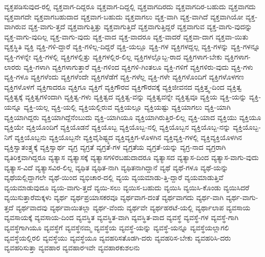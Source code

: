 {ವ್ಯಕ್ತಪಡಿಸುವುದ-ರಲ್ಲಿ
ವ್ಯಕ್ತವಾಗ-ದಿದ್ದರೂ
ವ್ಯಕ್ತವಾಗ-ದಿದ್ದಲ್ಲಿ
ವ್ಯಕ್ತವಾಗದಿರದು
ವ್ಯಕ್ತವಾಗದಿರ-ಬಹುದು
ವ್ಯಕ್ತವಾಗದು
ವ್ಯಕ್ತವಾಗದೇ
ವ್ಯಕ್ತವಾಗಬಹುದಾದ
ವ್ಯಕ್ತವಾಗ-ಬಹುದು
ವ್ಯಕ್ತವಾಗಲು
ವ್ಯಕ್ತ-ವಾಗಿ
ವ್ಯಕ್ತ-ವಾಗಿದೆ
ವ್ಯಕ್ತವಾಗಿಯೋ
ವ್ಯಕ್ತ-ವಾಗಿರುವ
ವ್ಯಕ್ತ-ವಾಗು-ತ್ತದೆ
ವ್ಯಕ್ತವಾಗುತ್ತಿತ್ತು
ವ್ಯಕ್ತವಾಗುತ್ತಿದೆ
ವ್ಯಕ್ತವಾಗುತ್ತಿದ್ದರೆ
ವ್ಯಕ್ತವಾಗುವ
ವ್ಯಕ್ತ-ವಾಗು-ವುದನ್ನು
ವ್ಯಕ್ತ-ವಾಗು-ವುದಿಲ್ಲ
ವ್ಯಕ್ತ-ವಾಗು-ವುದು
ವ್ಯಕ್ತ-ವಾದ
ವ್ಯಕ್ತ-ವಾದರೂ
ವ್ಯಕ್ತ-ವಾದರೆ
ವ್ಯಕ್ತವಾ-ದಾಗ
ವ್ಯಕ್ತವಾ-ಯಿತು
ವ್ಯಕ್ತಸ್ಥಿತಿ
ವ್ಯಕ್ತಿ
ವ್ಯಕ್ತಿ-ಗಳಿ-ದ್ದಾರೆ
ವ್ಯಕ್ತಿ-ಗಳಿಲ್ಲ-ದಿದ್ದರೆ
ವ್ಯಕ್ತಿ-ಯಲ್ಲೂ
ವ್ಯಕ್ತಿ-ಗಳ
ವ್ಯಕ್ತಿಗಳದ್ದಲ್ಲ
ವ್ಯಕ್ತಿ-ಗಳನ್ನು
ವ್ಯಕ್ತಿ-ಗಳನ್ನೂ
ವ್ಯಕ್ತಿ-ಗಳನ್ನೇ
ವ್ಯಕ್ತಿ-ಗಳಲ್ಲಿ
ವ್ಯಕ್ತಿಗಳಲ್ಲಿತ್ತು
ವ್ಯಕ್ತಿಗಳಲ್ಲಿರ-ಲಿಲ್ಲ
ವ್ಯಕ್ತಿಗಳಲ್ಲೊಬ್ಬ-ರಾದ
ವ್ಯಕ್ತಿಗಳಾಗ-ಬೇಕು
ವ್ಯಕ್ತಿಗಳಾಗ-ಲಾರರು
ವ್ಯಕ್ತಿ-ಗಳಾಗಿ
ವ್ಯಕ್ತಿಗಳಾಗುತ್ತಾರೆ
ವ್ಯಕ್ತಿ-ಗಳಿಂದ
ವ್ಯಕ್ತಿಗಳಿ-ಗಿಂತಲೂ
ವ್ಯಕ್ತಿ-ಗಳಿಗೆ
ವ್ಯಕ್ತಿಗಳಿರು-ವುದು
ವ್ಯಕ್ತಿ-ಗಳು
ವ್ಯಕ್ತಿ-ಗಳೂ
ವ್ಯಕ್ತಿಗಳೆಂದು
ವ್ಯಕ್ತಿಗಳೆಂದೇ
ವ್ಯಕ್ತಿಗಳೆಡೆಗೆ
ವ್ಯಕ್ತಿ-ಗಳೆಲ್ಲ
ವ್ಯಕ್ತಿ-ಗಳೇ
ವ್ಯಕ್ತಿಗಳೊಂದಿಗೆ
ವ್ಯಕ್ತಿಗಳೊಳಗಣ
ವ್ಯಕ್ತಿಗಳೊಳಗೆ
ವ್ಯಕ್ತಿಗಾದರೂ
ವ್ಯಕ್ತಿಗೂ
ವ್ಯಕ್ತಿಗೆ
ವ್ಯಕ್ತಿಗೌರವ
ವ್ಯಕ್ತಿಗೌರವಕ್ಕೆ
ವ್ಯಕ್ತಿಜೀವನದ
ವ್ಯಕ್ತಿತ್ತ್ವ-ದಿಂದ
ವ್ಯಕ್ತಿತ್ವ
ವ್ಯಕ್ತಿತ್ವಕ್ಕೆ
ವ್ಯಕ್ತಿತ್ವಗಳಿಂದಾಗಿ
ವ್ಯಕ್ತಿತ್ವ-ಗಳು
ವ್ಯಕ್ತಿತ್ವದ
ವ್ಯಕ್ತಿತ್ವ-ವನ್ನು
ವ್ಯಕ್ತಿತ್ವವನ್ನೇ
ವ್ಯಕ್ತಿತ್ವವೂ
ವ್ಯಕ್ತಿಯ
ವ್ಯಕ್ತಿ-ಯನ್ನು
ವ್ಯಕ್ತಿ-ಯನ್ನೂ
ವ್ಯಕ್ತಿ-ಯಲ್ಲ
ವ್ಯಕ್ತಿ-ಯಲ್ಲಿ
ವ್ಯಕ್ತಿಯಲ್ಲಿರುವ
ವ್ಯಕ್ತಿಯಲ್ಲೂ
ವ್ಯಕ್ತಿಯಷ್ಟು
ವ್ಯಕ್ತಿಯಾಗಲು
ವ್ಯಕ್ತಿ-ಯಾಗಿ
ವ್ಯಕ್ತಿಯಾಗಿದ್ದರು
ವ್ಯಕ್ತಿಯಾಗಿದ್ದೆನೆಂಬುದು
ವ್ಯಕ್ತಿ-ಯಾಗಿಯೂ
ವ್ಯಕ್ತಿಯಾಗಿರುತ್ತಿರ-ಲಿಲ್ಲ
ವ್ಯಕ್ತಿ-ಯಾದ
ವ್ಯಕ್ತಿಯು
ವ್ಯಕ್ತಿಯೂ
ವ್ಯಕ್ತಿಯೇ
ವ್ಯಕ್ತಿಯೊಂದಿಗೆ
ವ್ಯಕ್ತಿಯೊಡನೆ
ವ್ಯಕ್ತಿಯೊಬ್ಬ
ವ್ಯಕ್ತಿಯೊಬ್ಬ-ನಲ್ಲಿ
ವ್ಯಕ್ತಿಯೊಬ್ಬನ
ವ್ಯಕ್ತಿಯೊಬ್ಬ-ನನ್ನು
ವ್ಯಕ್ತಿಯೊಬ್ಬ-ನಿಗೆ
ವ್ಯಕ್ತಿಯೊಬ್ಬನು
ವ್ಯಕ್ತಿಯೊಬ್ಬನೇ
ವ್ಯಕ್ತಿವೈಶಿಷ್ಟ್ಯದ
ವ್ಯಕ್ತಿವ್ಯಕ್ತಿಗ-ಳೊಳಗಿನ
ವ್ಯಕ್ತಿವ್ಯಕ್ತಿ-ಗಳಲ್ಲಿ
ವ್ಯಕ್ತಿವ್ಯಕ್ತಿಯೊಳಗಿನ
ವ್ಯಕ್ತಿಸ್ವಾತಂತ್ರ್ಯಕ್ಕೆ
ವ್ಯಕ್ತಿಸ್ವಾರ್ಥ
ವ್ಯಗ್ರ
ವ್ಯಗ್ರತೆ
ವ್ಯಗ್ರತೆ-ಗಳ
ವ್ಯಗ್ರತೆಯ
ವ್ಯಗ್ರತೆ-ಯನ್ನು
ವ್ಯಗ್ರ-ನಾದ
ವ್ಯಗ್ರರಾಗಿ
ವ್ಯತಿರಿಕ್ತವಾಗಿದ್ದರೂ
ವ್ಯತ್ಯಾಸ
ವ್ಯತ್ಯಾಸಕ್ಕೆ
ವ್ಯತ್ಯಾಸಗಳಿರಬಹುದಾದರೂ
ವ್ಯತ್ಯಾಸದ
ವ್ಯತ್ಯಾಸ-ದಿಂದ
ವ್ಯತ್ಯಾಸ-ವಾಗು-ವುದು
ವ್ಯತ್ಯಾಸ-ವಿದೆ
ವ್ಯತ್ಯಾಸವಿರ-ಲಿಲ್ಲ
ವ್ಯಥಿತ
ವ್ಯಥಿತ-ನಾಗಿ
ವ್ಯಥಿತನಾಗಿದ್ದಾನೆ
ವ್ಯಥೆ
ವ್ಯಥೆ-ಗಳೂ
ವ್ಯಥೆ-ಯನ್ನು
ವ್ಯಥೆಯಲ್ಲಿದ್ದಾಗಲೇ
ವ್ಯಥೆ-ಯಿಂದ
ವ್ಯಭಿಚಾರ-ದಲ್ಲಿ
ವ್ಯಯ
ವ್ಯಯಮಾಡು-ತ್ತಿ-ದ್ದಾರೆ
ವ್ಯಯಮಾಡುತ್ತಿವೆ
ವ್ಯಯಮಾಡುವುದೂ
ವ್ಯಯ-ವಾಗು-ತ್ತದೆ
ವ್ಯಯಿ-ಸಲು
ವ್ಯಯಿಸ-ಬಹುದು
ವ್ಯಯಿಸಿ
ವ್ಯಯಿಸಿ-ಕೊಂಡು
ವ್ಯಯಿಸಿದರೆ
ವ್ಯಯಿಸುತ್ತಾರೆಮಕ್ಕಳು
ವ್ಯರ್ಥ
ವ್ಯರ್ಥಪ್ರಯಾಸಕರವೂ
ವ್ಯರ್ಥವಾಗ-ದಂತೆ
ವ್ಯರ್ಥವಾಗದು
ವ್ಯರ್ಥ-ವಾಗಿ
ವ್ಯರ್ಥ-ವಾಗು-ತ್ತದೆ
ವ್ಯರ್ಥವಾದವು
ವ್ಯರ್ಥವಾಯಿತಲ್ಲಾ
ವ್ಯರ್ಥ-ವೆಂದು
ವ್ಯರ್ಥವೇ
ವ್ಯರ್ಥಹರಟೆ-ಯಲ್ಲಿ
ವ್ಯರ್ಥಾಲಾಪ
ವ್ಯವಸಾಯ
ವ್ಯವಸಾಯಕ್ಕೆ
ವ್ಯವಸಾಯ-ದಿಂದ
ವ್ಯವಸ್ಥಿತ
ವ್ಯವಸ್ಥಿತ-ವಾಗಿ
ವ್ಯವಸ್ಥಿತ-ವಾದ
ವ್ಯವಸ್ಥೆ
ವ್ಯವಸ್ಥೆ-ಗಳ
ವ್ಯವಸ್ಥೆ-ಗಾಗಿ
ವ್ಯವಸ್ಥೆಗಾಗಿಯೂ
ವ್ಯವಸ್ಥೆಗೆ
ವ್ಯವಸ್ಥೆನಮ್ಮ
ವ್ಯವಸ್ಥೆಯ
ವ್ಯವಸ್ಥೆ-ಯನ್ನು
ವ್ಯವಸ್ಥೆ-ಯನ್ನೂ
ವ್ಯವಸ್ಥೆಯಲ್ಲಾಗಲಿ
ವ್ಯವಸ್ಥೆಯಲ್ಲಿರಲಿ
ವ್ಯವಸ್ಥೆಯು
ವ್ಯವಸ್ಥೆಯೂ
ವ್ಯವಹರಿಸತೊಡಗಿ-ದರು
ವ್ಯವಹರಿಸ-ಬೇಕು
ವ್ಯವಹರಿಸಿ-ದರು
ವ್ಯವಹರಿಸುತ್ತಾ
ವ್ಯವಹಾರ
ವ್ಯವಹಾರಇವೇ
ವ್ಯವಹಾರಕುಶಲನು
}

